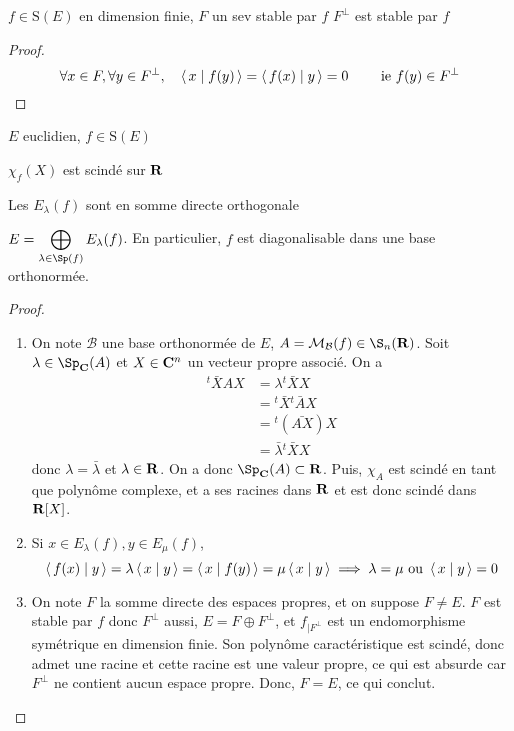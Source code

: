\begin{prop}
    \Hyp $f \in  \mathrm S(E)$ en dimension finie, $F$ un sev stable par  $f$
    \Conc  $F^\perp$ est stable par  $f$
\end{prop}

\begin{proof}
     \[
         \forall  x \in  F, \forall  y \in  F^\perp, \quad  \scalar{x}{f(y)} =\scalar{f(x)}{y} =0 \qquad  \text{ ie } f(y) \in  F^\perp
    \] 
\end{proof}

\begin{thm}
    \Hyp $E$ euclidien,  $f \in  \mathrm  S(E)$
    \begin{concenum}
    \item $\chi_f(X)$ est scindé sur  $ \mathbf R$
    \item Les $E_{\lambda}(f)$ sont en somme directe orthogonale
    \item $\displaystyle E=\bigoplus_{\lambda \in  \Sp(f)}E_{\lambda}(f)$. En particulier, $f$ est diagonalisable dans une base orthonormée.
    \end{concenum}
\end{thm}
\begin{proof}~
\begin{enumerate}
    \item     On note $\mathcal  B$ une base orthonormée de $E$,  $A=\mathcal  M_{\mathcal  B}(f) \in \S_n(\R)$. Soit $ \lambda \in  \Sp_{\C}(A)$ et $X \in \mathbf C^n$ un vecteur propre associé. On a 
\begin{align*}
    {}^t \bar X AX &= \lambda {}^t \bar XX \\
                         &= {}^t \bar X{}^t \bar AX\\
                         &= {}^t (\bar{A X})X \\
                         &= \bar\lambda {}^t \bar XX
\end{align*}
    donc $ \lambda=\bar\lambda$ et $\lambda \in  \mathbf R$. On a donc $\Sp_{\C}(A)\subset \R$. Puis, $\chi_A$ est scindé en tant que polynôme complexe, et a ses racines dans $\mathbf R$ et est donc scindé dans $\mathbf R[X]$.

    \item Si $x \in  E_{\lambda}(f), y \in  E_{\mu}(f)$, \[
            \scalar{f(x)}{y} =\lambda \scalar{x}{y} = \scalar{x}{f(y)} = \mu \scalar{x}{y} \implies \lambda=\mu \text{ ou } \scalar{x}{y} =0
    \] 
\item On note $F$ la somme directe des espaces propres, et on suppose  $F\neq E$.  $F$ est stable par  $f$ donc  $F^\perp$ aussi,  $E=F\oplus F^\perp$, et  $f_{|F^\perp}$ est un endomorphisme symétrique en dimension finie. Son polynôme caractéristique est scindé, donc admet une racine et cette racine est une valeur propre, ce qui est absurde car $F^\perp$ ne contient aucun espace propre. Donc,  $F=E$, ce qui conclut.
\end{enumerate}
\end{proof}

